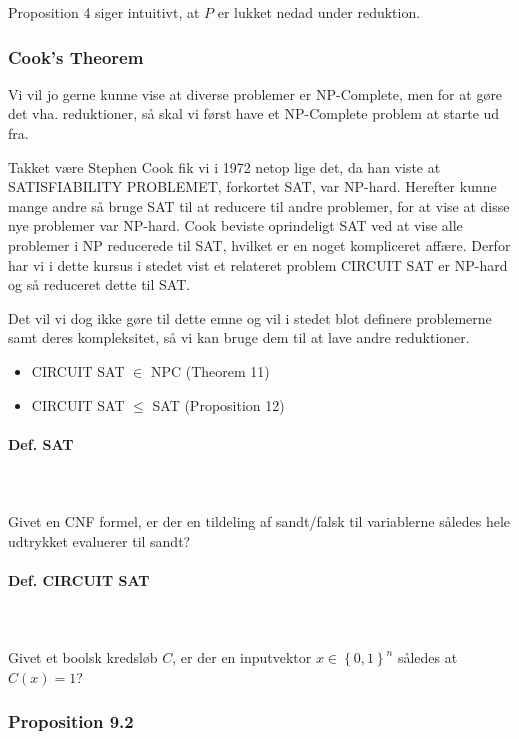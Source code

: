 Proposition 4 siger intuitivt, at $P$ er lukket nedad under reduktion. 


\subsubsection{Cook's Theorem}

Vi vil jo gerne kunne vise at diverse problemer er NP-Complete, men for at gøre det vha. reduktioner, så skal vi først have et NP-Complete problem at starte ud fra.

Takket være Stephen Cook fik vi i 1972 netop lige det, da han viste at SATISFIABILITY PROBLEMET, forkortet SAT, var NP-hard. Herefter kunne mange andre så bruge SAT til at reducere til andre problemer, for at vise at disse nye problemer var NP-hard. Cook beviste oprindeligt SAT ved at vise alle problemer i NP reducerede til SAT, hvilket er en noget kompliceret affære. Derfor har vi i dette kursus i stedet vist et relateret problem CIRCUIT SAT er NP-hard og så reduceret dette til SAT.

Det vil vi dog ikke gøre til dette emne og vil i stedet blot definere problemerne samt deres kompleksitet, så vi kan bruge dem til at lave andre reduktioner.

\begin{itemize}
 \item CIRCUIT SAT $\in$ NPC (Theorem 11)
 \item CIRCUIT SAT $\leq$ SAT (Proposition 12)
\end{itemize}

\paragraph{Def. SAT}
~\\
~\\
Givet en CNF formel, er der en tildeling af sandt/falsk til variablerne således hele udtrykket evaluerer til sandt?\\

\paragraph{Def. CIRCUIT SAT}
~\\
~\\
Givet et boolsk kredsløb $C$, er der en inputvektor $x \in \left\lbrace 0,1 \right\rbrace^n$ således at $C(x) = 1$?

\subsubsection{Proposition 9.2}

